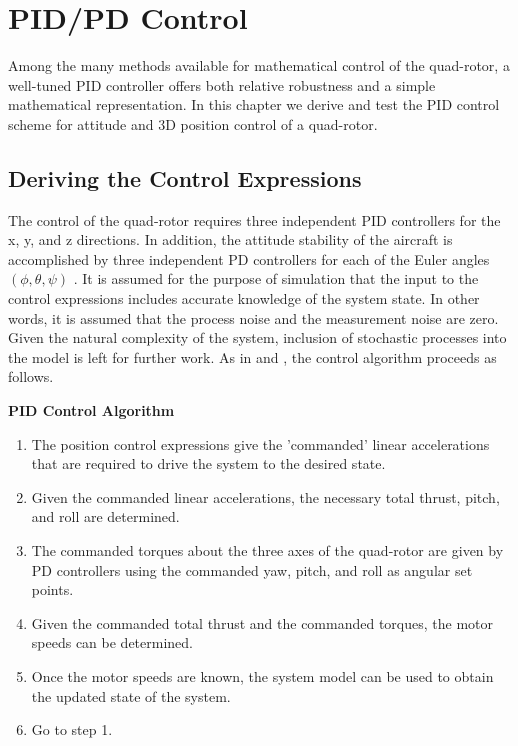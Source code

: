 
\chapter{PID/PD Control} %

\label{Chapter6} %


Among the many methods available for mathematical control of the quad-rotor, a well-tuned PID controller offers both relative robustness and a simple mathematical representation. In this chapter we derive and test the PID control scheme for attitude and 3D position control of a quad-rotor.


\section{Deriving the Control Expressions}

The control of the quad-rotor requires three independent PID controllers for the x, y, and z directions. In addition, the attitude stability of the aircraft is accomplished by three independent PD controllers for each of the Euler angles $(\phi,\theta,\psi)$ . It is assumed for the purpose of simulation that the input to the control expressions includes accurate knowledge of the system state. In other words, it is assumed that the process noise and the measurement noise are zero. Given the natural complexity of the system, inclusion of stochastic processes into the model is left for further work. As in \cite{bouabdallah2004pid} and \cite{Luukkonen}, the control algorithm proceeds as follows.

\begin{center}\textbf{PID Control Algorithm}\end{center}
    \begin{enumerate}
    \item The position control expressions give the 'commanded' linear accelerations that are required to drive the system to the desired state.
    \item Given the commanded linear accelerations, the necessary total thrust, pitch, and roll are determined.
    \item The commanded torques about the three axes of the quad-rotor are given by PD controllers using the commanded yaw, pitch, and roll as angular set points.
    \item Given the commanded total thrust and the commanded torques, the motor speeds can be determined.
    \item Once the motor speeds are known, the system model can be used to obtain the updated state of the system.
    \item Go to step 1.
    \end{enumerate}



